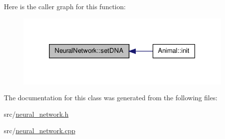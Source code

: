 Here is the caller graph for this function\-:\nopagebreak
\begin{figure}[H]
\begin{center}
\leavevmode
\includegraphics[width=306pt]{class_neural_network_a38e8afa4eb8651b80c48b577ecdc6c4a_icgraph}
\end{center}
\end{figure}




The documentation for this class was generated from the following files\-:\begin{DoxyCompactItemize}
\item 
src/\hyperlink{neural__network_8h}{neural\-\_\-network.\-h}\item 
src/\hyperlink{neural__network_8cpp}{neural\-\_\-network.\-cpp}\end{DoxyCompactItemize}
